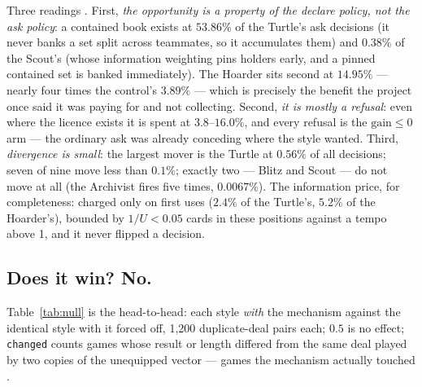 \documentclass[11pt]{article}
\newcommand{\code}[1]{\texttt{#1}}
\begin{document}
Three readings \cite{styles}. First, \emph{the opportunity is a property of
the declare policy, not the ask policy}: a contained book exists at $53.86\%$
of the Turtle's ask decisions (it never banks a set split across teammates,
so it accumulates them) and $0.38\%$ of the Scout's (whose information
weighting pins holders early, and a pinned contained set is banked
immediately). The Hoarder sits second at $14.95\%$ --- nearly four times the
control's $3.89\%$ --- which is precisely the benefit the project once said it
was paying for and not collecting. Second, \emph{it is mostly a refusal}: even
where the licence exists it is spent at $3.8$--$16.0\%$, and every refusal is
the $\mathrm{gain} \le 0$ arm --- the ordinary ask was already conceding
where the style wanted. Third, \emph{divergence is small}: the largest mover
is the Turtle at $0.56\%$ of all decisions; seven of nine move less than
$0.1\%$; exactly two --- Blitz and Scout --- do not move at all (the
Archivist fires five times, $0.0067\%$). The information price, for completeness:
charged only on first uses ($2.4\%$ of the Turtle's, $5.2\%$ of the
Hoarder's), bounded by $1/U < 0.05$ cards in these positions against a tempo
above 1, and it never flipped a decision.

\subsection{Does it win? No.}
\label{sec:mirror}

Table~\ref{tab:null} is the head-to-head: each style \emph{with} the mechanism
against the identical style with it forced off, 1{,}200 duplicate-deal pairs
each; $0.5$ is no effect; \code{changed} counts games whose result or length
differed from the same deal played by two copies of the unequipped vector ---
games the mechanism actually touched \cite{styles}.
\end{document}
